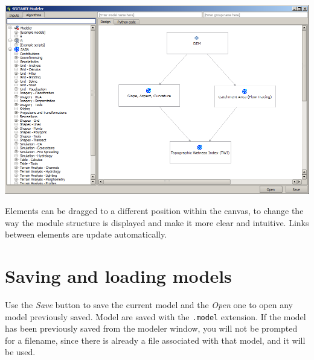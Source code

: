 \begin{center}
\includegraphics[width=.8\columnwidth]{models_parameters5.png}
\end{center}

Elements can be dragged to a different position within the canvas, to change the way the module structure is displayed and make it more clear and intuitive. Links between elements are update automatically.

%
%
%
%


\section{Saving and loading models}


Use the \emph{Save} button to save the current model and the \emph{Open} one to open any model previously saved. Model are saved with the \texttt{.model} extension. If the model has been previously saved from the modeler window, you will not be prompted for a filename, since there is already a file associated with that model, and it will be used.

